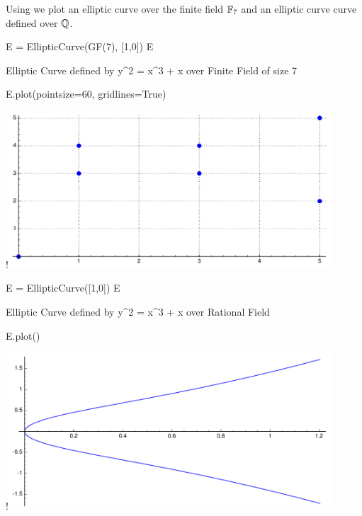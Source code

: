 Using \sage we plot an elliptic curve over the finite field
$\mathbb{F}_7$ and an elliptic curve curve defined over $\mathbb{Q}$.
\begin{sagecode} %
\begin{sagecell}
E = EllipticCurve(GF(7), [1,0])
E
\end{sagecell}
\begin{sageout}
Elliptic Curve defined by y^2 = x^3 + x over
    Finite Field of size 7
\end{sageout}
\begin{sagecell}
E.plot(pointsize=60, gridlines=True)
\end{sagecell}
\begin{sageout}[escapechar=!]
!\includegraphics[width=0.9\textwidth]{graphics/ecmod7}
\end{sageout}
\end{sagecode}

\begin{sagecode} %
\begin{sagecell}
E = EllipticCurve([1,0])
E
\end{sagecell}
\begin{sageout}
Elliptic Curve defined by y^2 = x^3 + x over
    Rational Field
\end{sageout}
\begin{sagecell}
E.plot()
\end{sagecell}
\begin{sageout}[escapechar=!]
!\includegraphics[width=0.9\textwidth]{graphics/ecq}
\end{sageout}
\end{sagecode}

